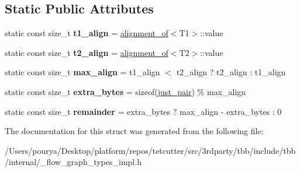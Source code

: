 \subsection*{Static Public Attributes}
\begin{DoxyCompactItemize}
\item 
\hypertarget{structinternal_1_1aligned__pair_a5831feac9838883d38f3bdc387dd73d4}{}static const size\+\_\+t {\bfseries t1\+\_\+align} = \hyperlink{structinternal_1_1alignment__of}{alignment\+\_\+of}$<$T1$>$\+::value\label{structinternal_1_1aligned__pair_a5831feac9838883d38f3bdc387dd73d4}

\item 
\hypertarget{structinternal_1_1aligned__pair_a24e12265ef478404ae850027e2dcd114}{}static const size\+\_\+t {\bfseries t2\+\_\+align} = \hyperlink{structinternal_1_1alignment__of}{alignment\+\_\+of}$<$T2$>$\+::value\label{structinternal_1_1aligned__pair_a24e12265ef478404ae850027e2dcd114}

\item 
\hypertarget{structinternal_1_1aligned__pair_aaebb8a825aa2ef90015ee6092e357f91}{}static const size\+\_\+t {\bfseries max\+\_\+align} = t1\+\_\+align $<$ t2\+\_\+align ? t2\+\_\+align \+: t1\+\_\+align\label{structinternal_1_1aligned__pair_aaebb8a825aa2ef90015ee6092e357f91}

\item 
\hypertarget{structinternal_1_1aligned__pair_ab0e8dd8f9e8e83023c94b2601d910e5c}{}static const size\+\_\+t {\bfseries extra\+\_\+bytes} = sizeof(\hyperlink{structinternal_1_1type__plus__align_3_01T1_00_01T2_00_010_01_4}{just\+\_\+pair}) \% max\+\_\+align\label{structinternal_1_1aligned__pair_ab0e8dd8f9e8e83023c94b2601d910e5c}

\item 
\hypertarget{structinternal_1_1aligned__pair_a970f4c0ec263c9cce73b803e53a68081}{}static const size\+\_\+t {\bfseries remainder} = extra\+\_\+bytes ? max\+\_\+align -\/ extra\+\_\+bytes \+: 0\label{structinternal_1_1aligned__pair_a970f4c0ec263c9cce73b803e53a68081}

\end{DoxyCompactItemize}


The documentation for this struct was generated from the following file\+:\begin{DoxyCompactItemize}
\item 
/\+Users/pourya/\+Desktop/platform/repos/tetcutter/src/3rdparty/tbb/include/tbb/internal/\+\_\+flow\+\_\+graph\+\_\+types\+\_\+impl.\+h\end{DoxyCompactItemize}
